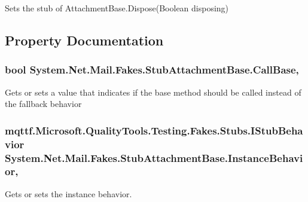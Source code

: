 Sets the stub of Attachment\-Base.\-Dispose(\-Boolean disposing)



\subsection{Property Documentation}
\hypertarget{class_system_1_1_net_1_1_mail_1_1_fakes_1_1_stub_attachment_base_a03340260052d71f64cbda01dc8b301d4}{
\subsubsection[{Call\-Base}]{\setlength{\rightskip}{0pt plus 5cm}bool System.\-Net.\-Mail.\-Fakes.\-Stub\-Attachment\-Base.\-Call\-Base\hspace{0.3cm}{\ttfamily [get]}, {\ttfamily [set]}}}\label{class_system_1_1_net_1_1_mail_1_1_fakes_1_1_stub_attachment_base_a03340260052d71f64cbda01dc8b301d4}


Gets or sets a value that indicates if the base method should be called instead of the fallback behavior

\hypertarget{class_system_1_1_net_1_1_mail_1_1_fakes_1_1_stub_attachment_base_aecba8427a1528521931637e88b655ba0}{
\subsubsection[{Instance\-Behavior}]{\setlength{\rightskip}{0pt plus 5cm}mqttf.\-Microsoft.\-Quality\-Tools.\-Testing.\-Fakes.\-Stubs.\-I\-Stub\-Behavior System.\-Net.\-Mail.\-Fakes.\-Stub\-Attachment\-Base.\-Instance\-Behavior\hspace{0.3cm}{\ttfamily [get]}, {\ttfamily [set]}}}\label{class_system_1_1_net_1_1_mail_1_1_fakes_1_1_stub_attachment_base_aecba8427a1528521931637e88b655ba0}


Gets or sets the instance behavior.

